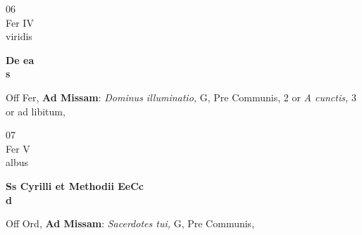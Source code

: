 \documentclass[10pt, openany]{book}
\begin{document}
        \begin{center}
            \begin{minipage}{3.5in}
                \vspace{2em}
                \begin{minipage}{0.5in}
                    {\Huge 06} \\
                    {\normalsize Fer IV} \\
                    {\normalsize viridis}
                \end{minipage}
                \begin{minipage}{3.0in}
                    \textbf{ \large De ea \\
                    \textnormal{\normalsize s}} \\ 
                \end{minipage}
                \begin{justify}Off Fer, \textbf{Ad Missam}: \textit{Dominus illuminatio,} G, Pre Communis, 2 or \textit{A cunctis,} 3 or ad libitum,  
                \end{justify}
            \end{minipage}
        \end{center}
    
        \begin{center}
            \begin{minipage}{3.5in}
                \vspace{2em}
                \begin{minipage}{0.5in}
                    {\Huge 07} \\
                    {\normalsize Fer V} \\
                    {\normalsize albus}
                \end{minipage}
                \begin{minipage}{3.0in}
                    \textbf{ \large Ss Cyrilli et Methodii EeCc \\
                    \textnormal{\normalsize d}} \\ 
                \end{minipage}
                \begin{justify}Off Ord, \textbf{Ad Missam}: \textit{Sacerdotes tui,} G, Pre Communis,  
                \end{justify}
            \end{minipage}
        \end{center}
    
\end{document}
